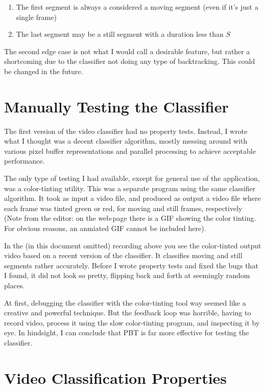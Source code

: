 \begin{enumerate}
\item The first segment is always a considered a moving segment (even if it's just a single frame)
\item The last segment may be a still segment with a duration less than $S$
\end{enumerate}
The second edge case is not what I would call a desirable feature, but rather a shortcoming due to the classifier not doing any type of backtracking. This could be changed in the future.

\section{Manually Testing the Classifier}


The first version of the video classifier had no property tests. Instead, I wrote what I thought was a decent classifier algorithm, mostly messing around with various pixel buffer representations and parallel processing to achieve acceptable performance.

The only type of testing I had available, except for general use of the application, was a color-tinting utility. This was a separate program using the same classifier algorithm. It took as input a video file, and produced as output a video file where each frame was tinted green or red, for moving and still frames, respectively (Note from the editor: on the web-page there is a GIF showing the color tinting. For obvious reasons, an anmiated GIF cannot be included here).

In the (in this document omitted) recording above you see the color-tinted output video based on a recent version of the classifier. It classifies moving and still segments rather accurately. Before I wrote property tests and fixed the bugs that I found, it did not look so pretty, flipping back and forth at seemingly random places.

At first, debugging the classifier with the color-tinting tool way seemed like a creative and powerful technique. But the feedback loop was horrible, having to record video, process it using the slow color-tinting program, and inspecting it by eye. In hindsight, I can conclude that PBT is far more effective for testing the classifier.

\section{Video Classification Properties}


